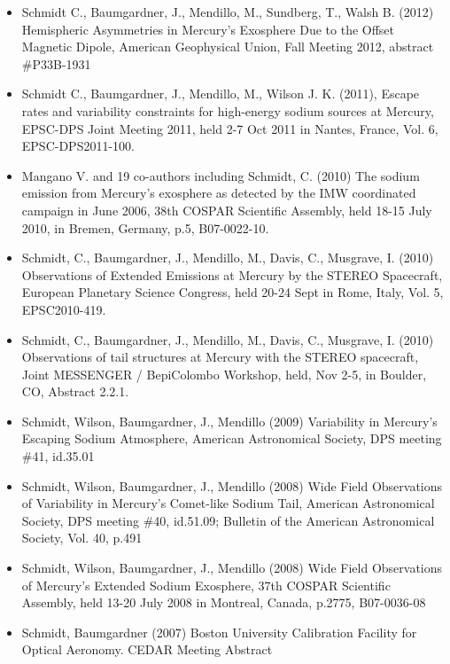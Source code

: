 \documentclass[12pt]{report}
\begin{document}
\begin{itemize}
   \item Schmidt C., Baumgardner, J., Mendillo, M., Sundberg, T., Walsh B. (2012) Hemispheric Asymmetries in Mercury's Exosphere Due to the Offset Magnetic Dipole, American Geophysical Union, Fall Meeting 2012, abstract \#P33B-1931
   \item Schmidt C., Baumgardner, J., Mendillo, M., Wilson J. K. (2011), Escape rates and variability constraints for high-energy sodium sources at Mercury, EPSC-DPS Joint Meeting 2011, held 2-7 Oct 2011 in Nantes, France, Vol. 6, EPSC-DPS2011-100.
   \item Mangano V. and 19 co-authors including Schmidt, C. (2010) The sodium emission from Mercury's exosphere as detected by the IMW coordinated campaign in June 2006, 38th COSPAR Scientific Assembly, held 18-15 July 2010, in Bremen, Germany, p.5, B07-0022-10. 
   \item Schmidt, C., Baumgardner, J., Mendillo, M., Davis, C., Musgrave, I. (2010) Observations of Extended Emissions at Mercury by the STEREO Spacecraft, European Planetary Science Congress, held 20-24 Sept in Rome, Italy, Vol. 5, EPSC2010-419.
   \item Schmidt, C., Baumgardner, J., Mendillo, M., Davis, C., Musgrave, I. (2010) Observations of tail structures at Mercury with the STEREO spacecraft, Joint MESSENGER / BepiColombo Workshop, held, Nov 2-5, in Boulder, CO, Abstract 2.2.1. 
   \item Schmidt, Wilson, Baumgardner, J., Mendillo (2009) Variability in Mercury's Escaping Sodium Atmosphere, American Astronomical Society, DPS meeting \#41, id.35.01
   \item Schmidt, Wilson, Baumgardner, J., Mendillo (2008) Wide Field Observations of Variability in Mercury's Comet-like Sodium Tail, American Astronomical Society, DPS meeting \#40, id.51.09; Bulletin of the American Astronomical Society, Vol. 40, p.491
   \item Schmidt, Wilson, Baumgardner, J., Mendillo (2008) Wide Field Observations of Mercury's Extended Sodium Exosphere, 37th COSPAR Scientific Assembly, held 13-20 July 2008 in Montreal, Canada, p.2775, B07-0036-08
   \item Schmidt, Baumgardner (2007) Boston University Calibration Facility for Optical Aeronomy. CEDAR Meeting Abstract
  \end{itemize}
\end{document}
